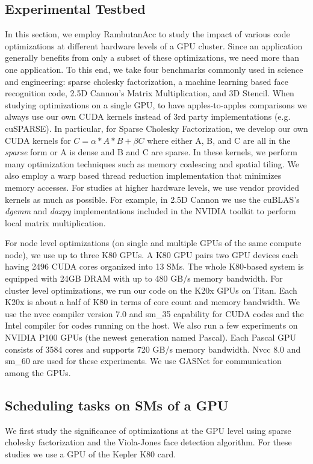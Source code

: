 \subsection{Experimental Testbed}
In this section, we employ RambutanAcc to study the impact of various code optimizations at different hardware levels of a GPU cluster.
Since an application generally benefits from only a subset of these optimizations, we need more than one application.
To this end, we take four benchmarks commonly used in science and engineering: sparse cholesky factorization, a machine learning based face recognition code, 2.5D Cannon's Matrix Multiplication, and 3D Stencil.
When studying optimizations on a single GPU, to have apples-to-apples comparisons we always use our own CUDA kernels instead of 3rd party implementations (e.g. cuSPARSE). 
In particular, for Sparse Cholesky Factorization, we develop our own CUDA kernels for $C = \alpha* A * B + \beta C$ where either A, B, and C are all in the {\em sparse} form or A is dense and B and C are sparse.
In these kernels, we perform many optimization techniques such as memory coalescing and spatial tiling.
We also employ a warp based thread reduction implementation that minimizes memory accesses. 
For studies at higher hardware levels, we use vendor provided kernels as much as possible.
For example, in  2.5D Cannon we use the cuBLAS's {\em dgemm} and {\em daxpy} implementations included in the NVIDIA toolkit to perform local matrix multiplication.

For node level optimizations (on single and multiple GPUs of the same compute node), we use up to three K80 GPUs.
A K80 GPU pairs two GPU devices each having 2496 CUDA cores organized into 13 SMs.
The whole K80-based system is equipped with 24GB DRAM with up to 480 GB/s memory bandwidth.
For cluster level optimizations, we run our code on the K20x GPUs on Titan. Each K20x is about a half of K80 in terms of core count and memory bandwidth.
We use the nvcc compiler version 7.0 and sm\_35 capability for CUDA codes and the Intel compiler for codes running on the host.
We also run a few experiments on NVIDIA P100 GPUs (the newest generation named Pascal).
Each Pascal GPU consists of 3584 cores and supports 720 GB/s memory bandwidth.
Nvcc 8.0 and sm\_60 are used for these experiments.
We use GASNet for communication among the GPUs. 


\subsection{Scheduling tasks on SMs of a GPU}
We first study the significance of optimizations at the GPU level using sparse cholesky factorization and the Viola-Jones face detection algorithm.
For these studies we use a GPU of the Kepler K80 card.


